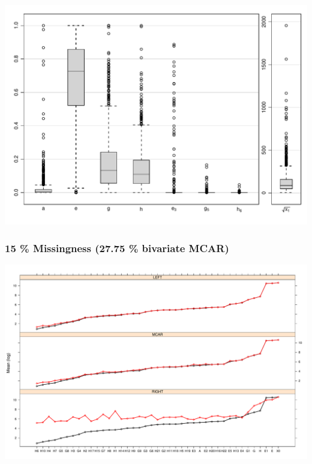 \documentclass[aspectratio=169]{beamer} %
\begin{document}
\begin{frame}
  \centering
\includegraphics[scale=.55]{bwplot.pdf}
 \end{frame}
 
 \begin{frame}
   \frametitle{15 \% Missingness (27.75 \% bivariate MCAR)}
  \centering
\includegraphics[scale=.3]{plot15.pdf}
 \end{frame}
 
\end{document}
